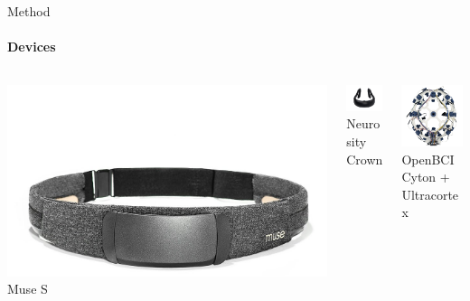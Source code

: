 \documentclass[xcolor={dvipsnames,table},12pt]{beamer}
\begin{document}
\begin{frame}{Method}
    \framesubtitle{Devices}

    \begin{columns}
        \begin{column}{0.33\textwidth}
            \vspace{9mm}
            \centering
            \includegraphics[trim=0 -50 0 200,clip,width=\textwidth]{./img/Muse-S.jpg}
            \\ Muse S
        \end{column}

        \begin{column}{0.33\textwidth}
            \vspace{4mm}
            \centering
            \includegraphics[trim=200 150 200 100,clip,width=3cm]{./img/crown-1.png}
            \\ Neurosity Crown
        \end{column}

        \begin{column}{0.33\textwidth}
            \centering
            \includegraphics[width=3cm]{./img/openbci-cyton.jpg}
            \\ OpenBCI Cyton + Ultracortex
        \end{column}
    \end{columns}

    \vspace{-5mm}
    \begin{adjustbox}{width=\textwidth,center,float=table}
        
    \end{adjustbox}
\end{frame}
\end{document}
